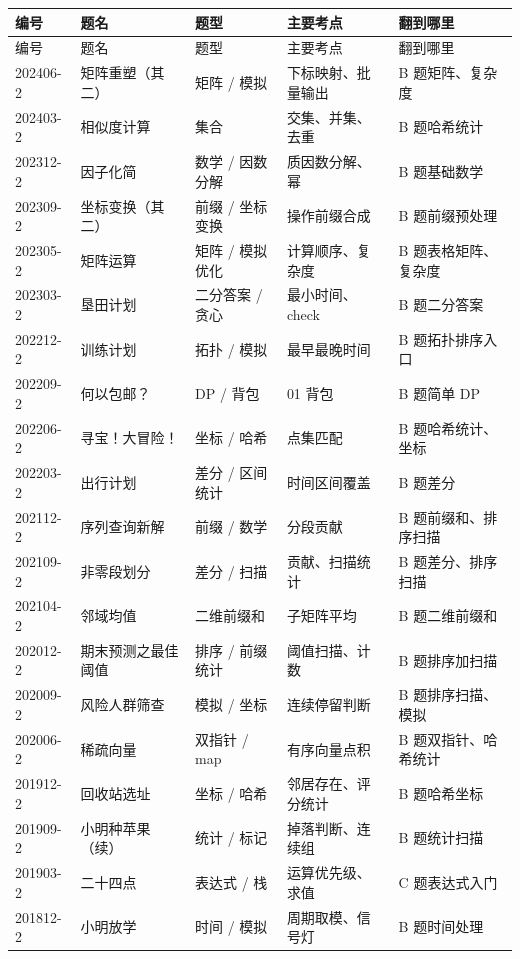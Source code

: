 \begingroup
\small
\setlength{\tabcolsep}{3pt}
\begin{longtable}{p{1.8cm}p{2.8cm}p{2.6cm}p{3.5cm}p{3.5cm}}
\toprule
编号 & 题名 & 题型 & 主要考点 & 翻到哪里 \\
\midrule
\endfirsthead
\toprule
编号 & 题名 & 题型 & 主要考点 & 翻到哪里 \\
\midrule
\endhead
202406-2 & 矩阵重塑（其二） & 矩阵 / 模拟 & 下标映射、批量输出 & B 题矩阵、复杂度 \\
202403-2 & 相似度计算 & 集合 & 交集、并集、去重 & B 题哈希统计 \\
202312-2 & 因子化简 & 数学 / 因数分解 & 质因数分解、幂 & B 题基础数学 \\
202309-2 & 坐标变换（其二） & 前缀 / 坐标变换 & 操作前缀合成 & B 题前缀预处理 \\
202305-2 & 矩阵运算 & 矩阵 / 模拟优化 & 计算顺序、复杂度 & B 题表格矩阵、复杂度 \\
202303-2 & 垦田计划 & 二分答案 / 贪心 & 最小时间、check & B 题二分答案 \\
202212-2 & 训练计划 & 拓扑 / 模拟 & 最早最晚时间 & B 题拓扑排序入口 \\
202209-2 & 何以包邮？ & DP / 背包 & 01 背包 & B 题简单 DP \\
202206-2 & 寻宝！大冒险！ & 坐标 / 哈希 & 点集匹配 & B 题哈希统计、坐标 \\
202203-2 & 出行计划 & 差分 / 区间统计 & 时间区间覆盖 & B 题差分 \\
202112-2 & 序列查询新解 & 前缀 / 数学 & 分段贡献 & B 题前缀和、排序扫描 \\
202109-2 & 非零段划分 & 差分 / 扫描 & 贡献、扫描统计 & B 题差分、排序扫描 \\
202104-2 & 邻域均值 & 二维前缀和 & 子矩阵平均 & B 题二维前缀和 \\
202012-2 & 期末预测之最佳阈值 & 排序 / 前缀统计 & 阈值扫描、计数 & B 题排序加扫描 \\
202009-2 & 风险人群筛查 & 模拟 / 坐标 & 连续停留判断 & B 题排序扫描、模拟 \\
202006-2 & 稀疏向量 & 双指针 / map & 有序向量点积 & B 题双指针、哈希统计 \\
201912-2 & 回收站选址 & 坐标 / 哈希 & 邻居存在、评分统计 & B 题哈希坐标 \\
201909-2 & 小明种苹果（续） & 统计 / 标记 & 掉落判断、连续组 & B 题统计扫描 \\
201903-2 & 二十四点 & 表达式 / 栈 & 运算优先级、求值 & C 题表达式入门 \\
201812-2 & 小明放学 & 时间 / 模拟 & 周期取模、信号灯 & B 题时间处理 \\

\end{longtable}
